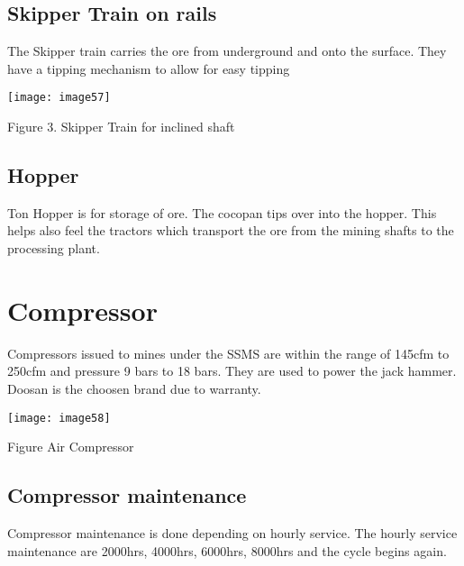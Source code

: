 \subsection{ Skipper Train on rails}

\noindent The Skipper train carries the ore from underground and onto the surface. They have a tipping mechanism to allow for easy tipping\par

\noindent \texttt{[image: image57]}

\noindent Figure 3. Skipper Train for inclined shaft


\subsection{ Hopper}

 Ton Hopper is for storage of ore. The cocopan tips over into the hopper. This helps also feel the tractors which transport the ore from the mining shafts to the processing plant.  \par


\section{ Compressor}

\noindent Compressors issued to mines under the SSMS are within the range of 145cfm to 250cfm and pressure 9 bars to 18 bars. They are used to power the jack hammer. Doosan is the choosen brand due to warranty. \par

\noindent \texttt{[image: image58]}

\noindent Figure Air Compressor


\subsection{ Compressor maintenance}

\noindent \textbf{}

\noindent Compressor maintenance is done depending on hourly service. The hourly service maintenance are 2000hrs, 4000hrs, 6000hrs, 8000hrs and the cycle begins again.\par

